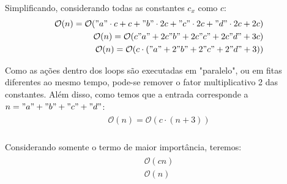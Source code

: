 \documentclass{article}
\begin{document}
Simplificando, considerando todas as constantes $c_x$ como $c$:
\begin{align}
  \begin{split}
    \mathcal{O}(n) = \mathcal{O}("a" \cdot c + c + "b" \cdot 2c + "c" \cdot 2c + "d" \cdot 2c + 2c) \\
    \mathcal{O}(n) = \mathcal{O}(c"a" + 2c"b" + 2c"c" + 2c"d" + 3c) \\
    \mathcal{O}(n) = \mathcal{O}(c \cdot ("a" + 2"b" + 2"c" + 2"d" + 3)) \\
\end{split}
\end{align}

Como as ações dentro dos loops são executadas em "paralelo", ou em fitas
diferentes ao mesmo tempo, pode-se remover o fator multiplicativo 2 das
constantes. Além disso, como temos que a entrada corresponde a $n = "a" + "b" + "c" + "d"$:
\begin{align}
  \begin{split}
    \mathcal{O}(n) = \mathcal{O}(c \cdot (n + 3)) \\
\end{split}
\end{align}

Considerando somente o termo de maior importância, teremos:
\begin{align}
  \begin{split}
    \mathcal{O}(cn) \\
    \mathcal{O}(n)
\end{split}
\end{align}
\end{document}
